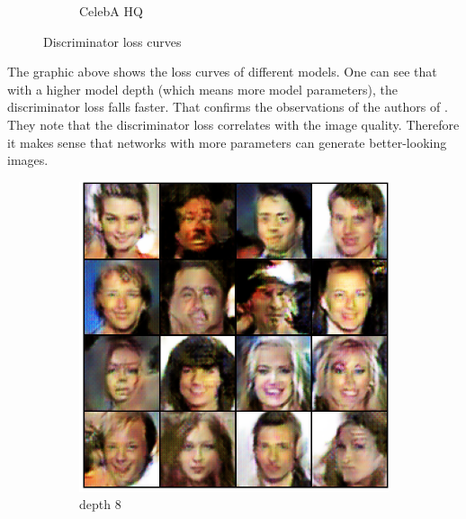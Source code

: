 \begin{figure}[H]
\begin{subfigure}[b]{0.45\textwidth}
        \caption{CelebA HQ}
        \label{fig:anime_face_d_loss}
    \end{subfigure}
    \caption{Discriminator loss curves}
    \label{fig:d_loss}
\end{figure}

The graphic above shows the loss curves of different models. One can see that with a higher model depth (which means more model parameters), the discriminator loss falls faster. That confirms the observations of the authors of \cite{arjovsky2017wgan}. They note that the discriminator loss correlates with the image quality. Therefore it makes sense that networks with more parameters can generate better-looking images. \\

\begin{figure}[H]
    \centering
    \begin{subfigure}[b]{0.24\textwidth}
        \centering
        \includegraphics[width=\textwidth]{resources/images/output_celeba_8.eps}
        \caption{depth 8}
        \label{fig:celeba_8}
    \end{subfigure}
    \hfill
    \begin{subfigure}[b]{0.24\textwidth}
        \centering

\end{subfigure}
\end{figure}
